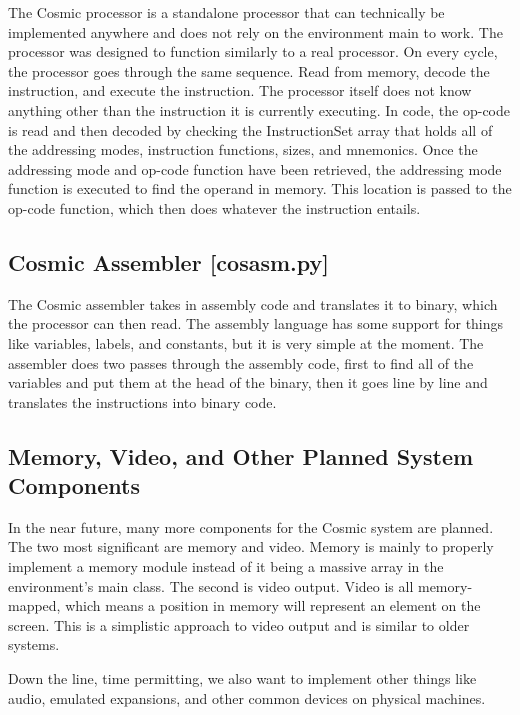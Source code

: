 \documentclass[conference]{IEEEtran}
\begin{document}
The Cosmic processor is a standalone processor that can technically be implemented anywhere and does not rely on the environment main to work. The processor was designed to function similarly to a real processor. On every cycle, the processor goes through the same sequence. Read from memory, decode the instruction, and execute the instruction. The processor itself does not know anything other than the instruction it is currently executing. In code, the op-code is read and then decoded by checking the InstructionSet array that holds all of the addressing modes, instruction functions, sizes, and mnemonics. Once the addressing mode and op-code function have been retrieved, the addressing mode function is executed to find the operand in memory. This location is passed to the op-code function, which then does whatever the instruction entails.


\subsection{Cosmic Assembler [cosasm.py]}

The Cosmic assembler takes in assembly code and translates it to binary, which the processor can then read. The assembly language has some support for things like variables, labels, and constants, but it is very simple at the moment. The assembler does two passes through the assembly code, first to find all of the variables and put them at the head of the binary, then it goes line by line and translates the instructions into binary code.


\subsection{Memory, Video, and Other Planned System Components}
In the near future, many more components for the Cosmic system are planned. The two most significant are memory and video. Memory is mainly to properly implement a memory module instead of it being a massive array in the environment's main class. The second is video output. Video is all memory-mapped, which means a position in memory will represent an element on the screen. This is a simplistic approach to video output and is similar to older systems.

Down the line, time permitting, we also want to implement other things like audio, emulated expansions, and other common devices on physical machines. 
\end{document}
